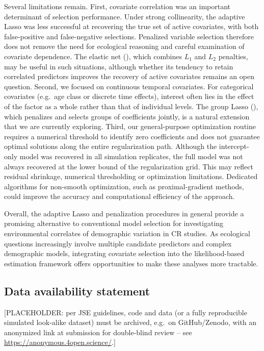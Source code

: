 \documentclass[
  11pt,
  a4paper,
]{article}
\begin{document}
Several limitations remain. First, covariate correlation was an important determinant of selection performance. Under strong collinearity, the adaptive Lasso was less successful at recovering the true set of active covariates, with both false-positive and false-negative selections. Penalized variable selection therefore does not remove the need for ecological reasoning and careful examination of covariate dependence. The elastic net (), which combines \(L_1\) and \(L_2\) penalties, may be useful in such situations, although whether its tendency to retain correlated predictors improves the recovery of active covariates remains an open question. Second, we focused on continuous temporal covariates. For categorical covariates (e.g.~age class or discrete time effects), interest often lies in the effect of the factor as a whole rather than that of individual levels. The group Lasso (), which penalizes and selects groups of coefficients jointly, is a natural extension that we are currently exploring. Third, our general-purpose optimization routine requires a numerical threshold to identify zero coefficients and does not guarantee optimal solutions along the entire regularization path. Although the intercept-only model was recovered in all simulation replicates, the full model was not always recovered at the lower bound of the regularization grid. This may reflect residual shrinkage, numerical thresholding or optimization limitations. Dedicated algorithms for non-smooth optimization, such as proximal-gradient methods, could improve the accuracy and computational efficiency of the approach.

Overall, the adaptive Lasso and penalization procedures in general provide a promising alternative to conventional model selection for investigating environmental correlates of demographic variation in CR studies. As ecological questions increasingly involve multiple candidate predictors and complex demographic models, integrating covariate selection into the likelihood-based estimation framework offers opportunities to make these analyses more tractable.

\subsection{Data availability statement}\label{data-availability-statement}

{[}PLACEHOLDER: per JSE guidelines, code and data (or a fully reproducible simulated look-alike dataset) must be archived, e.g.~on GitHub/Zenodo, with an anonymized link at submission for double-blind review -- see \url{https://anonymous.4open.science/}.{]}
\end{document}
